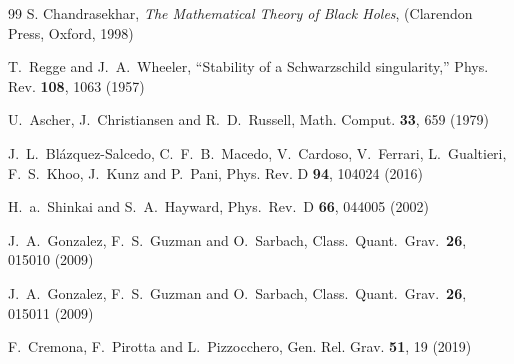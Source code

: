 \documentclass[a4paper,12pt]{article}
\begin{document}
\begin{thebibliography}{99}
S. Chandrasekhar,
\emph{The Mathematical Theory of Black Holes}, 
(Clarendon Press, Oxford, 1998)

T.~Regge and J.~A.~Wheeler,
``Stability of a Schwarzschild singularity,''
Phys. Rev. \textbf{108}, 1063 (1957)

U.~Ascher, J.~Christiansen and R.~D.~Russell,
Math. Comput. \textbf{33}, 659 (1979)

J.~L.~Bl\'azquez-Salcedo, C.~F.~B.~Macedo, V.~Cardoso, V.~Ferrari, L.~Gualtieri, F.~S.~Khoo, J.~Kunz and P.~Pani,
Phys. Rev. D \textbf{94}, 104024 (2016)

  H.~a.~Shinkai and S.~A.~Hayward,
  Phys.\ Rev.\ D {\bf 66}, 044005 (2002)

  J.~A.~Gonzalez, F.~S.~Guzman and O.~Sarbach,
  Class.\ Quant.\ Grav.\  {\bf 26}, 015010 (2009)

  J.~A.~Gonzalez, F.~S.~Guzman and O.~Sarbach,
  Class.\ Quant.\ Grav.\  {\bf 26},  015011 (2009)


F.~Cremona, F.~Pirotta and L.~Pizzocchero,
Gen. Rel. Grav. \textbf{51}, 19 (2019)


\end{thebibliography}
\end{document}
